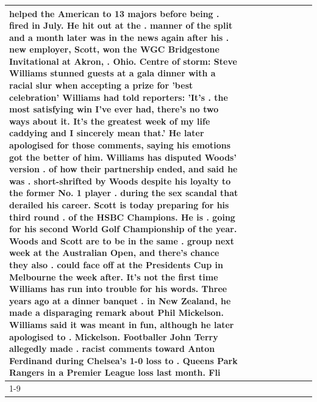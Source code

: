 \begin{table}[H]
\begin{tabular}{lllrlllll}
helped the American to 13 majors before being . fired in July. He hit out at the . manner of the split and a month later was in the news again after his . new employer, Scott, won the WGC Bridgestone Invitational at Akron, . Ohio. Centre of storm: Steve Williams stunned guests at a gala dinner with a racial slur when accepting a prize for 'best celebration' Williams had told reporters: 'It's . the most satisfying win I've ever had, there's no two ways about it. It's the greatest week of my life caddying and I sincerely mean that.' He later apologised for those comments, saying his emotions got the better of him. Williams has disputed Woods' version . of how their partnership ended, and said he was . short-shrifted by Woods despite his loyalty to the former No. 1 player . during the sex scandal that derailed his career. Scott is today preparing for his third round . of the HSBC Champions. He is . going for his second World Golf Championship of the year. Woods and Scott are to be in the same . group next week at the Australian Open, and there's chance they also . could face off at the Presidents Cup in Melbourne the week after. It's not the first time Williams has run into trouble for his words. Three years ago at a dinner banquet . in New Zealand, he made a disparaging remark about Phil Mickelson. Williams said it was meant in fun, although he later apologised to . Mickelson. Footballer John Terry allegedly made . racist comments toward Anton Ferdinand during Chelsea's 1-0 loss to . Queens Park Rangers in a Premier League loss last month. Fli \\
\cline{1-9}

\end{tabular}
\end{table}
